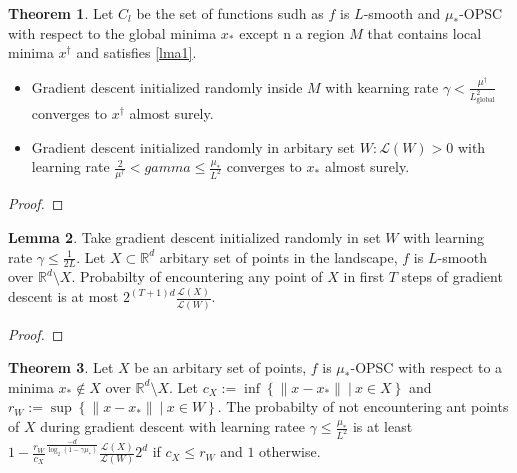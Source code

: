 \documentclass{article}
\theoremstyle{definition}
\newtheorem{theorem}{Theorem}[section]
\newtheorem{lemma}[theorem]{Lemma}
\begin{document}
\begin{theorem}\label{thm1}
    Let $C_l$ be the set of functions sudh as $f$ is 
    $L$-smooth and $\mu_\ast$-OPSC with respect to the 
    global minima $x_\ast$ except n a region $M$ that 
    contains local minima $x^\dagger$ and satisfies \cref{lma1}.
    \begin{itemize}
        \item Gradient descent initialized randomly inside $M$ 
        with kearning rate $\gamma < \frac{\mu^\dagger}{L^2_{\mathrm{global}}}$
        converges to $x^\dagger$ almost surely.
        
        \item Gradient descent initialized randomly in 
        arbitary set $W: \mathcal{L}(W) > 0$ 
        with learning rate $\frac{2}{\mu^\dagger} < gamma \leq \frac{\mu_\ast}{L^2}$
        converges to $x_\ast$ almost surely.

    \end{itemize} 

\end{theorem}
\begin{proof}
    
\end{proof}

\begin{lemma}\label{lma2}
    Take gradient descent initialized randomly in set $W$ 
    with learning rate $\gamma \leq \frac{1}{2L}$.
    Let $X \subset \mathbb{R}^d$ arbitary set of points in 
    the landscape, $f$ is $L$-smooth over 
    $\mathbb{R}^d \setminus X$. Probabilty of encountering 
    any point of $X$ in first $T$ steps of gradient descent is 
    at most $2 ^ {(T + 1)d} \frac{\mathcal{L}(X)}{\mathcal{L}(W)}$.
\end{lemma}
\begin{proof}
    
\end{proof}

\begin{theorem}\label{thm2}
    Let $X$ be an arbitary set of points, 
    $f$ is $\mu_\ast$-OPSC with respect to a minima 
    $x_\ast \notin X$ over $\mathbb{R}^d \setminus X$.
    Let $c_X := \inf \left\{ \| x - x_\ast \| \:|\: x \in X  \right\}$
    and $r_W := \sup \left\{ \| x - x_\ast \| \:|\: x \in W \right\}$.
    The probabilty of not encountering ant points of $X$ during 
    gradient descent with learning ratee $\gamma \leq \frac{\mu_\ast}{L^2}$
    is at least $1 - \frac{r_W}{c_X}^{\frac{-d}{\log_2(1 - \gamma \mu_\ast)}} \frac{\mathcal{L}(X)}{\mathcal{L}(W)} 2^d$
    if $c_X \leq r_W$ and $1$ otherwise.
\end{theorem}
\end{document}
